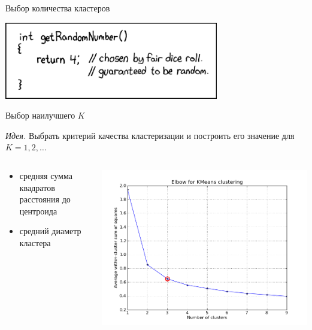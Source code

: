 \documentclass[aspectratio=169]{beamer}
\begin{document}
\begin{frame}

\begin{center}
{\Large Выбор количества кластеров}

\vspace{2em}
\includegraphics[width=0.7\textwidth]{images/random_number.png}
\end{center}

\end{frame}

\begin{frame}{Выбор наилучшего $K$}

{\it Идея.} Выбрать критерий качества кластеризации и построить его значение для $K = 1, 2, \ldots$

\begin{columns}[]
    \begin{column}{.5\textwidth} 
    \begin{itemize}
	\item средняя сумма квадратов расстояния до центроида
	\item средний диаметр кластера
	\end{itemize} 		    
    \end{column}
    \begin{column}{.5\textwidth}
    \vspace{1em}
    \includegraphics[scale=0.3]{images/elbow.png}    
    \end{column}
\end{columns}

\end{frame}
\end{document}
